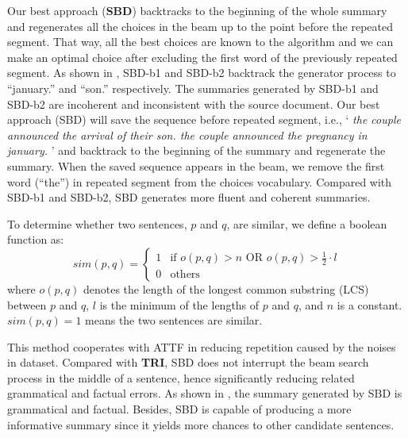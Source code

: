 Our best approach (\textbf{SBD}) backtracks to the beginning of the whole summary
and regenerates all the choices in the beam up to the point before
the repeated segment. That way, all the best choices are known to the
algorithm and we can make an optimal choice after excluding the first word
of the previously repeated segment. 
As shown in ,
SBD-b1 and SBD-b2 backtrack the generator process
to ``january.'' and ``son.'' respectively.
The summaries generated by SBD-b1 and SBD-b2 
are incoherent and inconsistent with the source document.
Our best approach (SBD) will save the sequence before repeated segment, i.e., 
`\textit{
the couple announced the arrival of their son.
the couple announced the pregnancy in january.}
'
and backtrack to the beginning of the summary and regenerate the summary. 
When the saved sequence appears in the beam, we remove the first word (``the'') in 
repeated segment from the choices vocabulary. 
Compared with SBD-b1 and SBD-b2, SBD generates more fluent and coherent summaries.


To determine whether two sentences, 
$p$ and $q$, are similar, we define a boolean function as:
\begin{equation}\label{eq:s}
	sim(p,q) = 
	\begin{cases}
		   1 &\mbox{if $o(p,q) > n\text{ OR }o(p,q) > \frac{1}{2}\cdot l$}\\
		   0 &\mbox{others}
   \end{cases}
\end{equation}
where $o(p,q)$ denotes the length of 
the longest common substring (LCS) between $p$ and $q$, 
$l$ is the minimum of the lengths of $p$ and $q$, and $n$ is a constant. 
$sim(p,q)=1$ means the two sentences are similar.

This method cooperates with ATTF in 
reducing repetition caused by the noises in dataset.
Compared with \textbf{TRI},  SBD does not interrupt the beam search process in the middle of a sentence, hence significantly reducing related grammatical and factual errors. 
As shown in , 
the summary generated by SBD is grammatical and factual. 
Besides, SBD is capable of producing a more informative summary since it yields more chances to other candidate sentences.
